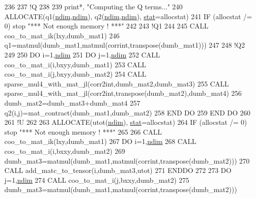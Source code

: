 \begin{DoxyCode}
236 
237     \textcolor{comment}{!Q}
238 
239     print*, \textcolor{stringliteral}{"Computing the Q terms..."}
240     \textcolor{keyword}{ALLOCATE}(q1(\hyperlink{namespaceparams_a2323fe1773f086e20c14f266351c482b}{ndim},\hyperlink{namespaceparams_a2323fe1773f086e20c14f266351c482b}{ndim}), q2(\hyperlink{namespaceparams_a2323fe1773f086e20c14f266351c482b}{ndim},\hyperlink{namespaceparams_a2323fe1773f086e20c14f266351c482b}{ndim}), \hyperlink{namespacestat}{stat}=allocstat)
241     \textcolor{keywordflow}{IF} (allocstat /= 0) stop \textcolor{stringliteral}{"*** Not enough memory ! ***"}
242 
243     \textcolor{comment}{!Q1}
244 
245     \textcolor{keyword}{CALL }coo\_to\_mat\_ik(lxy,dumb\_mat1)
246     q1=matmul(dumb\_mat1,matmul(corrint,transpose(dumb\_mat1)))
247     
248     \textcolor{comment}{!Q2}
249 
250     \textcolor{keywordflow}{DO} i=1,\hyperlink{namespaceparams_a2323fe1773f086e20c14f266351c482b}{ndim}
251        \textcolor{keywordflow}{DO} j=1,\hyperlink{namespaceparams_a2323fe1773f086e20c14f266351c482b}{ndim}
252           \textcolor{keyword}{CALL }coo\_to\_mat\_i(i,bxyy,dumb\_mat1)
253           \textcolor{keyword}{CALL }coo\_to\_mat\_i(j,bxyy,dumb\_mat2)
254           \textcolor{keyword}{CALL }sparse\_mul4\_with\_mat\_jl(corr2int,dumb\_mat2,dumb\_mat3)
255           \textcolor{keyword}{CALL }sparse\_mul4\_with\_mat\_jl(corr2int,transpose(dumb\_mat2),dumb\_mat4)
256           dumb\_mat2=dumb\_mat3+dumb\_mat4
257           q2(i,j)=mat\_contract(dumb\_mat1,dumb\_mat2)
258 \textcolor{keywordflow}{       END DO}
259 \textcolor{keywordflow}{    END DO}
260           
261     \textcolor{comment}{!U}
262     
263     \textcolor{keyword}{ALLOCATE}(utot(\hyperlink{namespaceparams_a2323fe1773f086e20c14f266351c482b}{ndim}), \hyperlink{namespacestat}{stat}=allocstat)
264     \textcolor{keywordflow}{IF} (allocstat /= 0) stop \textcolor{stringliteral}{"*** Not enough memory ! ***"}
265 
266     \textcolor{keyword}{CALL }coo\_to\_mat\_ik(lxy,dumb\_mat1)
267     \textcolor{keywordflow}{DO} i=1,\hyperlink{namespaceparams_a2323fe1773f086e20c14f266351c482b}{ndim}
268        \textcolor{keyword}{CALL }coo\_to\_mat\_i(i,bxxy,dumb\_mat2)
269        dumb\_mat3=matmul(dumb\_mat1,matmul(corrint,transpose(dumb\_mat2)))
270        \textcolor{keyword}{CALL }add\_matc\_to\_tensor(i,dumb\_mat3,utot)
271 \textcolor{keywordflow}{    ENDDO}
272 
273     \textcolor{keywordflow}{DO} j=1,\hyperlink{namespaceparams_a2323fe1773f086e20c14f266351c482b}{ndim}
274        \textcolor{keyword}{CALL }coo\_to\_mat\_i(j,bxxy,dumb\_mat2)
275        dumb\_mat3=matmul(dumb\_mat1,matmul(corrint,transpose(dumb\_mat2)))

\end{DoxyCode}
